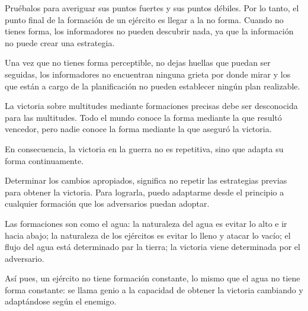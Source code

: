 Pruébalos para averiguar sus puntos fuertes y sus puntos débiles. Por lo tanto, el punto final de la formación de un ejército es llegar a la no forma. Cuando no tienes forma, los informadores no pueden descubrir nada, ya que la información no puede crear una estrategia.

Una vez que no tienes forma perceptible, no dejas huellas que puedan ser seguidas, los informadores no encuentran ninguna grieta por donde mirar y los que están a cargo de la planificación no pueden establecer ningún plan realizable.

La victoria sobre multitudes mediante formaciones precisas debe ser desconocida para las multitudes. Todo el mundo conoce la forma mediante la que resultó vencedor, pero nadie conoce la forma mediante la que aseguró la victoria.

En consecuencia, la victoria en la guerra no es repetitiva, sino que adapta su forma continuamente.

Determinar los cambios apropiados, significa no repetir las estrategias previas para obtener la victoria. Para lograrla, puedo adaptarme desde el principio a cualquier formación que los adversarios puedan adoptar.

Las formaciones son como el agua: la naturaleza del agua es evitar lo alto e ir hacia abajo; la naturaleza de los ejércitos es evitar lo lleno y atacar lo vacío; el flujo del agua está determinado par la tierra; la victoria viene determinada por el adversario.

Así pues, un ejército no tiene formación constante, lo mismo que el agua no tiene forma constante: se llama genio a la capacidad de obtener la victoria cambiando y adaptándose según el enemigo.
